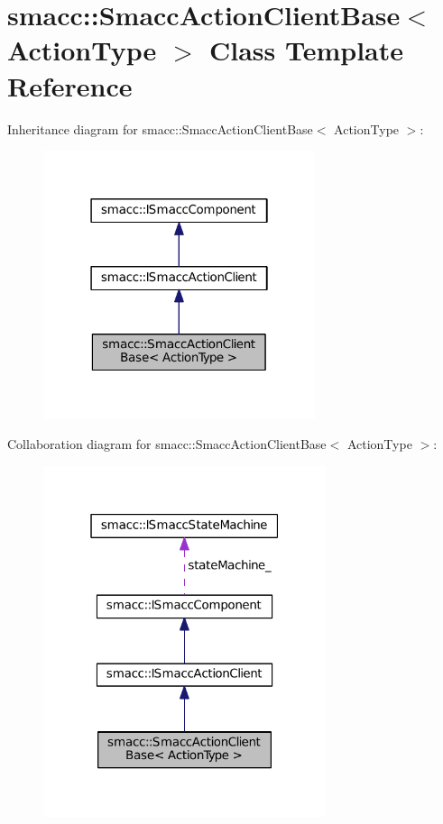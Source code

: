 \hypertarget{classsmacc_1_1SmaccActionClientBase}{}\section{smacc\+:\+:Smacc\+Action\+Client\+Base$<$ Action\+Type $>$ Class Template Reference}
\label{classsmacc_1_1SmaccActionClientBase}


Inheritance diagram for smacc\+:\+:Smacc\+Action\+Client\+Base$<$ Action\+Type $>$\+:
\nopagebreak
\begin{figure}[H]
\begin{center}
\leavevmode
\includegraphics[width=226pt]{classsmacc_1_1SmaccActionClientBase__inherit__graph}
\end{center}
\end{figure}


Collaboration diagram for smacc\+:\+:Smacc\+Action\+Client\+Base$<$ Action\+Type $>$\+:
\nopagebreak
\begin{figure}[H]
\begin{center}
\leavevmode
\includegraphics[width=235pt]{classsmacc_1_1SmaccActionClientBase__coll__graph}
\end{center}
\end{figure}
